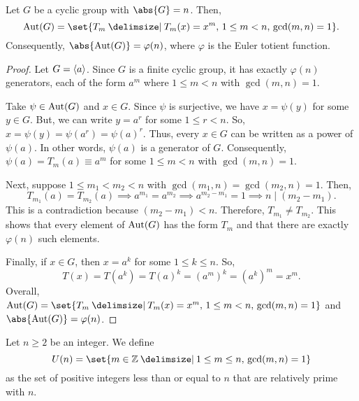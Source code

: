 \documentclass[11pt]{penrose}
\begin{document}
\begin{nthm}
    Let $G$ be a cyclic group with $\abs{G} = n$. Then,
    \begin{equation*}
        \Aut(G) = \set{T_{m} \st T_{m}(x) = x^{m},\, 1 \leq m < n,\, \gcd(m,n) = 1}.
    \end{equation*}
    Consequently, $\abs{\Aut(G)} = \varphi(n)$, where $\varphi$ is the Euler totient function.
\end{nthm}
\begin{proof}
    Let $G = \langle a\rangle$. Since $G$ is a finite cyclic group, it has exactly $\varphi(n)$ generators, each of the form $a^{m}$ where $1 \leq m < n$ with $\gcd(m,n) = 1$.

    Take $\psi \in \operatorname{Aut}(G)$ and $x \in G$. Since $\psi$ is surjective, we have $x = \psi(y)$ for some $y \in G$. But, we can write $y = a^{r}$ for some $1 \leq r < n$. So, $x = \psi(y) = \psi(a^{r}) = \psi(a)^{r}$. Thus, every $x \in G$ can be written as a power of $\psi(a)$. In other words, $\psi(a)$ is a generator of $G$. Consequently, $\psi(a) = T_{m}(a) \equiv a^{m}$ for some $1 \leq m < n$ with $\gcd(m,n) = 1$.

    Next, suppose $1 \leq m_{1} < m_{2} < n$ with $\gcd(m_{1}, n) = \gcd(m_{2}, n) = 1$. Then,
    \begin{equation*}
        T_{m_{1}}(a) = T_{m_{2}}(a)
        \implies a^{m_{1}} = a^{m_{2}}
        \implies a^{m_{2} - m_{1}} = 1
        \implies n \mid (m_{2} - m_{1}).
    \end{equation*}
    This is a contradiction because $(m_{2} - m_{1}) < n$. Therefore, $T_{m_{1}} \neq T_{m_{2}}$. This shows that every element of $\operatorname{Aut}(G)$ has the form $T_{m}$ and that there are exactly $\varphi(n)$ such elements.

    Finally, if $x \in G$, then $x = a^{k}$ for some $1 \leq k \leq n$. So,
    \begin{equation*}
        T(x) = T(a^{k}) = T(a)^{k} = (a^{m})^{k} = (a^{k})^{m} = x^{m}.
    \end{equation*}
    Overall, $\Aut(G) = \set{T_{m} \st T_{m}(x) = x^{m},\, 1 \leq m < n,\, \gcd(m,n) = 1}$ and $\abs{\Aut(G)} = \varphi(n)$.
\end{proof}

\begin{ndfn}
    Let $n \geq 2$ be an integer. We define
    \begin{equation*}
        U(n) = \set{m \in \Z \st 1 \leq m \leq n,\, \gcd(m, n) = 1}
    \end{equation*}
    as the set of positive integers less than or equal to $n$ that are relatively prime with $n$.
\end{ndfn}
\end{document}
